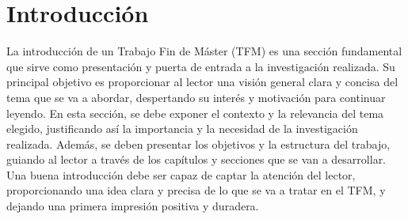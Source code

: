 \label{chapter:introduccion}\chapter{Introducción}

La introducción de un Trabajo Fin de Máster (TFM) es una sección fundamental que sirve como presentación y puerta de entrada a la investigación realizada. Su principal objetivo es proporcionar al lector una visión general clara y concisa del tema que se va a abordar, despertando su interés y motivación para continuar leyendo. En esta sección, se debe exponer el contexto y la relevancia del tema elegido, justificando así la importancia y la necesidad de la investigación realizada. Además, se deben presentar los objetivos y la estructura del trabajo, guiando al lector a través de los capítulos y secciones que se van a desarrollar. Una buena introducción debe ser capaz de captar la atención del lector, proporcionando una idea clara y precisa de lo que se va a tratar en el TFM, y dejando una primera impresión positiva y duradera.

